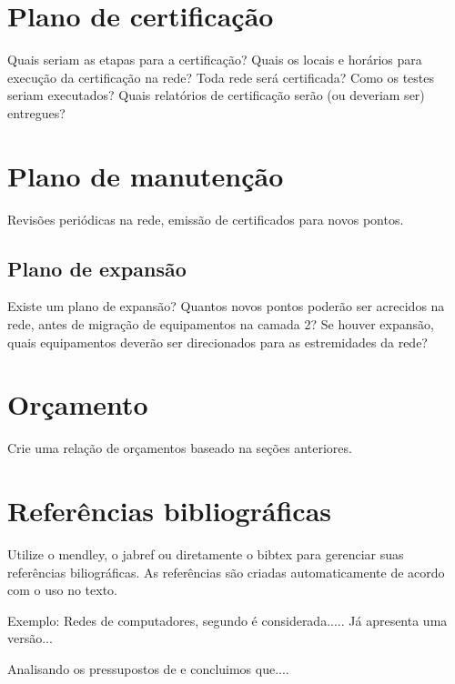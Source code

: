 \documentclass[	DIV=calc,%
							paper=a4,%
							fontsize=12pt,%
							onecolumn]{scrartcl}	 					%
\begin{document}
\section{Plano de certificação}
Quais seriam as etapas para a certificação? 
Quais os locais e horários para execução da certificação na rede? Toda rede será certificada?
Como os testes seriam executados?
Quais relatórios de certificação serão (ou deveriam ser) entregues? 

\section{Plano de manutenção}

Revisões periódicas na rede, emissão de certificados para novos pontos.

\subsection{Plano de expansão}
Existe um plano de expansão? Quantos novos pontos poderão ser acrecidos na rede, antes de migração de equipamentos na camada 2? Se houver expansão, quais equipamentos deverão ser direcionados para as estremidades da rede? 


\section{Orçamento}
Crie uma relação de orçamentos baseado na seções anteriores.

\section{Referências bibliográficas}
Utilize o mendley, o jabref ou diretamente o bibtex para gerenciar suas referências biliográficas. As referências são criadas automaticamente de acordo com o uso no texto.

Exemplo: Redes de computadores, segundo \cite{t2013} é considerada..... Já \cite{kurose2010} apresenta uma versão...

Analisando os pressupostos de \cite{ref3} e \cite{ref4} concluimos que....


\renewcommand\refname{} %

  

\end{document}
